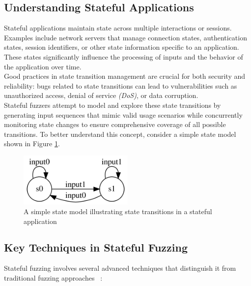 \subsection{Understanding Stateful Applications}
Stateful applications maintain state across multiple interactions or sessions. Examples include network servers that manage connection states, authentication states, session identifiers, or other state information specific to an application. These states significantly influence the processing of inputs and the behavior of the application over time.
\\Good practices in state transition management are crucial for both security and reliability: bugs related to state transitions can lead to vulnerabilities such as unauthorized access, denial of service \textit{(DoS)}, or data corruption. 
\\Stateful fuzzers attempt to model and explore these state transitions by generating input sequences that mimic valid usage scenarios while concurrently monitoring state changes to ensure comprehensive coverage of all possible transitions. To better understand this concept, consider a simple state model shown in Figure \ref{fig:simplestatemodel}.
\begin{figure}[h]
    \centering
    \includegraphics[width=0.5\textwidth]{Images/simplestatemodel.png}
    \caption{A simple state model illustrating state transitions in a stateful application}
    \label{fig:simplestatemodel}
\end{figure}


\subsection{Key Techniques in Stateful Fuzzing}
Stateful fuzzing involves several advanced techniques that distinguish it from traditional fuzzing approaches ~\cite{theartoffuzzing}:

